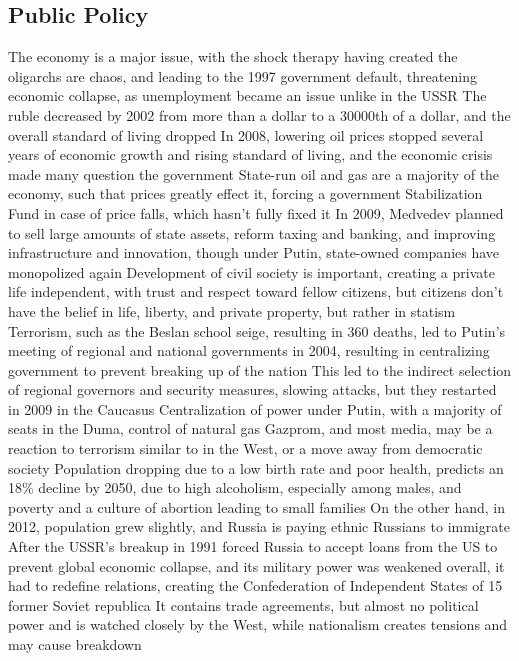 \documentclass[11 pt, twoside]{article}
\newenvironment{outline*}
{
	\begin{outline}[enumerate]
	}
	{\end{outline}
}
\begin{document}
\subsection{Public Policy}
\begin{outline*}
\1 The economy is a major issue, with the shock therapy having created the oligarchs are chaos, and leading to the 1997 government default, threatening economic collapse, as unemployment became an issue unlike in the USSR
\2 The ruble decreased by 2002 from more than a dollar to a 30000th of a dollar, and the overall standard of living dropped
\2 In 2008, lowering oil prices stopped several years of economic growth and rising standard of living, and the economic crisis made many question the government
\2 State-run oil and gas are a majority of the economy, such that prices greatly effect it, forcing a government Stabilization Fund in case of price falls, which hasn't fully fixed it
\2 In 2009, Medvedev planned to sell large amounts of state assets, reform taxing and banking, and improving infrastructure and innovation, though under Putin, state-owned companies have monopolized again
\1 Development of civil society is important, creating a private life independent, with trust and respect toward fellow citizens, but citizens don't have the belief in life, liberty, and private property, but rather in statism
\1 Terrorism, such as the Beslan school seige, resulting in 360 deaths, led to Putin's meeting of regional and national governments in 2004, resulting in centralizing government to prevent breaking up of the nation
\2 This led to the indirect selection of regional governors and security measures, slowing attacks, but they restarted in 2009 in the Caucasus
\1 Centralization of power under Putin, with a majority of seats in the Duma, control of natural gas Gazprom, and most media, may be a reaction to terrorism similar to in the West, or a move away from democratic society
\1 Population dropping due to a low birth rate and poor health, predicts an 18\% decline by 2050, due to high alcoholism, especially among males, and poverty and a culture of abortion leading to small families
\2 On the other hand, in 2012, population grew slightly, and Russia is paying ethnic Russians to immigrate
\1 After the USSR's breakup in 1991 forced Russia to accept loans from the US to prevent global economic collapse, and its military power was weakened overall, it had to redefine relations, creating the Confederation of Independent States of 15 former Soviet republica
\2 It contains trade agreements, but almost no political power and is watched closely by the West, while nationalism creates tensions and may cause breakdown

\end{outline*}
\end{document}
